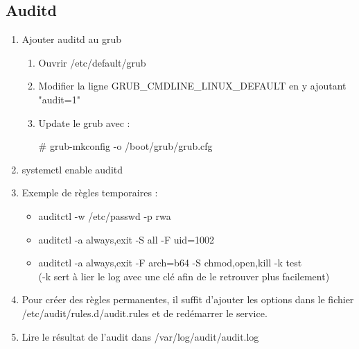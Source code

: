 \documentclass[a4paper]{article}
\begin{document}
\subsection{Auditd}
\begin{enumerate}
    \item Ajouter auditd au grub
    \begin{enumerate}
        \item Ouvrir /etc/default/grub
        \item Modifier la ligne GRUB\_CMDLINE\_LINUX\_DEFAULT en y ajoutant "audit=1"
        \item Update le grub avec :\\
        \begin{example}
        \# grub-mkconfig -o /boot/grub/grub.cfg
        \end{example}
    \end{enumerate}
    \item systemctl enable auditd
    \item Exemple de règles temporaires :
    \begin{itemize}
        \item auditctl -w /etc/passwd -p rwa
        \item auditctl -a always,exit -S all -F uid=1002
        \item auditctl -a always,exit -F arch=b64 -S chmod,open,kill -k test\\ (-k sert à lier le log avec une clé afin de le retrouver plus facilement)
    \end{itemize}
    \item Pour créer des règles permanentes, il suffit d'ajouter les options dans le fichier /etc/audit/rules.d/audit.rules et de redémarrer le service.
    \item Lire le résultat de l'audit dans /var/log/audit/audit.log
\end{enumerate}
\end{document}
